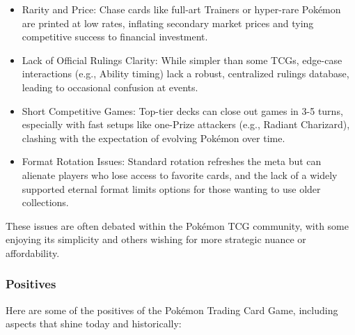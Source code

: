 \begin{itemize}
\item Rarity and Price: Chase cards like full-art Trainers or hyper-rare Pokémon are printed at low rates, inflating secondary market prices and tying competitive success to financial investment.
\item Lack of Official Rulings Clarity: While simpler than some TCGs, edge-case interactions (e.g., Ability timing) lack a robust, centralized rulings database, leading to occasional confusion at events.
\item Short Competitive Games: Top-tier decks can close out games in 3-5 turns, especially with fast setups like one-Prize attackers (e.g., Radiant Charizard), clashing with the expectation of evolving Pokémon over time.
\item Format Rotation Issues: Standard rotation refreshes the meta but can alienate players who lose access to favorite cards, and the lack of a widely supported eternal format limits options for those wanting to use older collections.
\end{itemize}

These issues are often debated within the Pokémon TCG community, with some enjoying its simplicity and others wishing for more strategic nuance or affordability.


\subsubsection{Positives}

Here are some of the positives of the Pokémon Trading Card Game, including aspects that shine today and historically:

